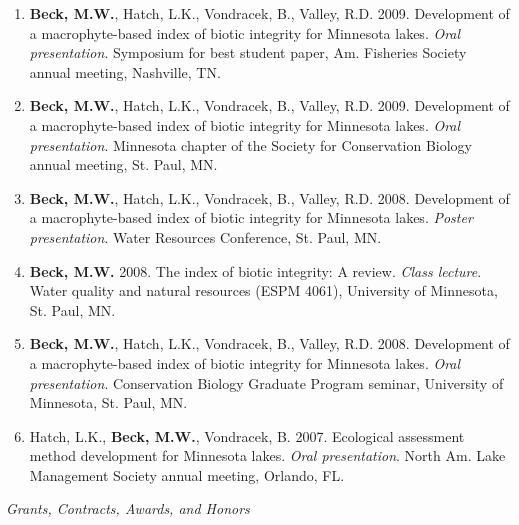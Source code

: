 \documentclass[letterpaper,12pt]{article}
\newcommand{\sectitle}[1]{\vspace{\baselineskip} \centerline{\large{\textit{#1}}}}
\begin{document}
\begin{enumerate}
\item {\bf Beck, M.W.}, Hatch, L.K., Vondracek, B., Valley, R.D. 2009. Development of a macrophyte-based index of biotic integrity for Minnesota lakes. \textit{Oral presentation}. Symposium for best student paper, Am. Fisheries Society annual meeting, Nashville, TN.

\item {\bf Beck, M.W.}, Hatch, L.K., Vondracek, B., Valley, R.D. 2009. Development of a macrophyte-based index of biotic integrity for Minnesota lakes. \textit{Oral presentation}. Minnesota chapter of the Society for Conservation Biology annual meeting, St. Paul, MN.

\item {\bf Beck, M.W.}, Hatch, L.K., Vondracek, B., Valley, R.D. 2008. Development of a macrophyte-based index of biotic integrity for Minnesota lakes. \textit{Poster presentation}. Water Resources Conference, St. Paul, MN.

\item {\bf Beck, M.W.} 2008. The index of biotic integrity: A review. \textit{Class lecture}. Water quality and natural resources (ESPM 4061), University of Minnesota, St. Paul, MN.

\item {\bf Beck, M.W.}, Hatch, L.K., Vondracek, B., Valley, R.D. 2008. Development of a macrophyte-based index of biotic integrity for Minnesota lakes. \textit{Oral presentation}. Conservation Biology Graduate Program seminar, University of Minnesota, St. Paul, MN.

\item Hatch, L.K., {\bf Beck, M.W.}, Vondracek, B. 2007. Ecological assessment method development for Minnesota lakes. \textit{Oral presentation}. North Am. Lake Management Society annual meeting, Orlando, FL.

\end{enumerate}

\sectitle{Grants, Contracts, Awards, and Honors}
\end{document}
